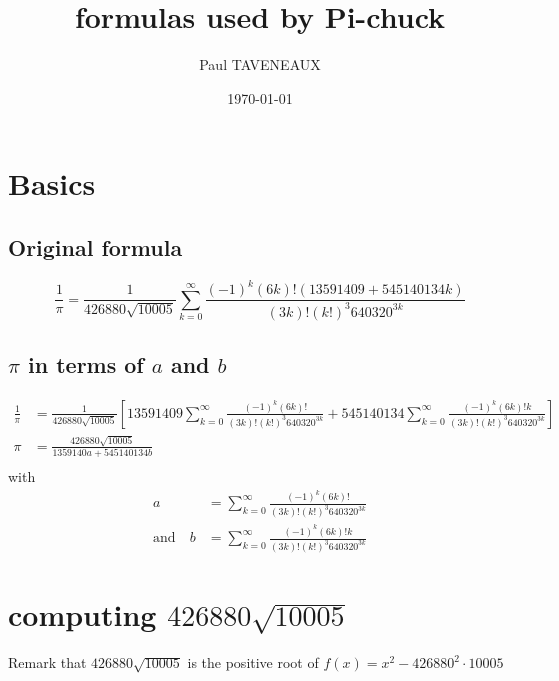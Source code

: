 \documentclass[fleqn]{report}
\title{formulas used by Pi-chuck}
\author{Paul TAVENEAUX}
\date{\today}
\begin{document}
\maketitle
\newpage

\chapter{Basics}

\section{Original formula}
\[
  \frac{1}{\pi} = \frac{1}{426880\sqrt{10005}}\sum_{ k = 0 }^{\infty}\frac{{(-1)}^k(6k)!(13591409 + 545140134k)}{(3k)!{(k!)}^{3}640320^{3k}}
\]

\section{$\pi$ in terms of $a$ and $b$}

\begin{align*}
  \frac{1}{\pi} & = \frac{1}{426880\sqrt{10005}}\left[13591409\sum_{k = 0}^{\infty}\frac{{(-1)}^k(6k)!}{(3k)!{(k!)}^{3}640320^{3k}} + 545140134\sum_{k = 0}^{\infty}\frac{{(-1)}^k(6k)!k}{(3k)!{(k!)}^{3}640320^{3k}}\right] \\
  \pi           & = \frac{426880\sqrt{10005}}{1359140a + 545140134b}                                                                                                                                                         \\
\end{align*}
with
\begin{align*}
  a                  & = \sum_{k = 0}^{\infty}\frac{{(-1)}^k(6k)! }{(3k)!{(k!)}^{3}640320^{3k}} \\
  \text{and} \quad b & = \sum_{k = 0}^{\infty}\frac{{(-1)}^k(6k)!k}{(3k)!{(k!)}^{3}640320^{3k}}
\end{align*}

\chapter{computing $ 426880\sqrt{10005} $}

Remark that $ 426880 \sqrt{10005} $ is the positive root of $ f(x) = x^2
  -426880^2 \cdot 10005$
\end{document}
